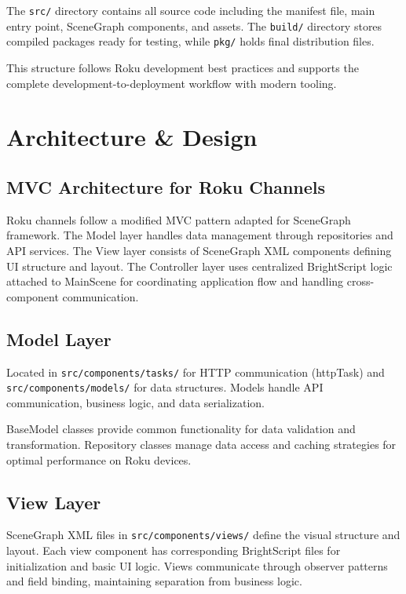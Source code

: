 \documentclass[11pt,letterpaper]{article}
\begin{document}
The \texttt{src/} directory contains all source code including the manifest file, main entry point, SceneGraph components, and assets. The \texttt{build/} directory stores compiled packages ready for testing, while \texttt{pkg/} holds final distribution files.

This structure follows Roku development best practices and supports the complete development-to-deployment workflow with modern tooling.

\section{Architecture \& Design}
\label{sec:architecture-design}

\subsection{MVC Architecture for Roku Channels}
Roku channels follow a modified MVC pattern adapted for SceneGraph framework. The Model layer handles data management through repositories and API services. The View layer consists of SceneGraph XML components defining UI structure and layout. The Controller layer uses centralized BrightScript logic attached to MainScene for coordinating application flow and handling cross-component communication.

\subsection{Model Layer}
Located in \texttt{src/components/tasks/} for HTTP communication (httpTask) and \texttt{src/components/models/} for data structures. Models handle API communication, business logic, and data serialization.

BaseModel classes provide common functionality for data validation and transformation. Repository classes manage data access and caching strategies for optimal performance on Roku devices.

\subsection{View Layer}
SceneGraph XML files in \texttt{src/components/views/} define the visual structure and layout. Each view component has corresponding BrightScript files for initialization and basic UI logic. Views communicate through observer patterns and field binding, maintaining separation from business logic.
\end{document}

